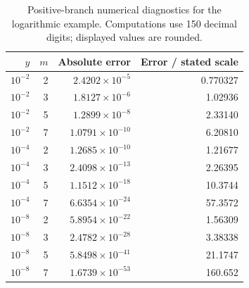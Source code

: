 \begin{table}[htbp]
\centering\small
\begin{tabular}{rrrr}
\toprule
$y$ & $m$ & Absolute error & Error / stated scale \\
\midrule
$10^{-2}$ & 2 & $2.4202\times10^{-5}$ & 0.770327 \\
$10^{-2}$ & 3 & $1.8127\times10^{-6}$ & 1.02936 \\
$10^{-2}$ & 5 & $1.2899\times10^{-8}$ & 2.33140 \\
$10^{-2}$ & 7 & $1.0791\times10^{-10}$ & 6.20810 \\
$10^{-4}$ & 2 & $1.2685\times10^{-10}$ & 1.21677 \\
$10^{-4}$ & 3 & $2.4098\times10^{-13}$ & 2.26395 \\
$10^{-4}$ & 5 & $1.1512\times10^{-18}$ & 10.3744 \\
$10^{-4}$ & 7 & $6.6354\times10^{-24}$ & 57.3572 \\
$10^{-8}$ & 2 & $5.8954\times10^{-22}$ & 1.56309 \\
$10^{-8}$ & 3 & $2.4782\times10^{-28}$ & 3.38338 \\
$10^{-8}$ & 5 & $5.8498\times10^{-41}$ & 21.1747 \\
$10^{-8}$ & 7 & $1.6739\times10^{-53}$ & 160.652 \\
\bottomrule
\end{tabular}
\caption{Positive-branch numerical diagnostics for the logarithmic example. Computations use 150 decimal digits; displayed values are rounded.}
\label{tab:lognumeric}
\end{table}
